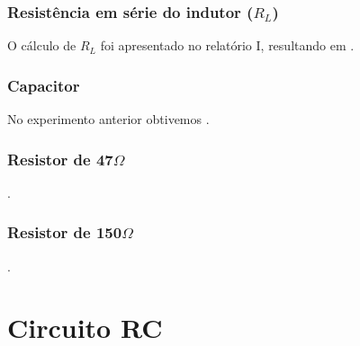\documentclass[12pt,letterpaper]{article}
\begin{document}
\subsubsection{Resistência em série do indutor ($R_L$)} \label{itm:rindutor}  O cálculo de $R_L$ foi apresentado no relatório I, resultando em .
\subsubsection{Capacitor} \label{itm:capacitor} No experimento anterior obtivemos .
\subsubsection{Resistor de 47$\Omega$}\label{itm:r47} .
\subsubsection{Resistor de 150$\Omega$}\label{itm:r150} .
\section{Circuito RC}
\end{document}
